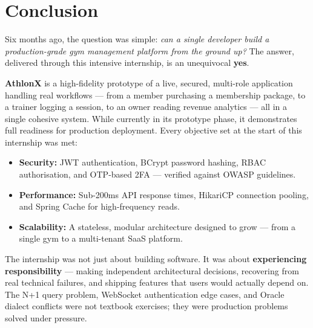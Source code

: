 \documentclass[
  12pt,
  a4paperpaper,
]{report}
\begin{document}
\clearpage

\chapter{Conclusion}\label{conclusion-1}

\noindent
Six months ago, the question was simple: \textit{can a single developer build a production-grade gym management platform from the ground up?} The answer, delivered through this intensive internship, is an unequivocal \textbf{yes}.

\vspace{0.4cm}

\noindent
\textbf{AthlonX} is a high-fidelity prototype of a live, secured, multi-role application handling real workflows --- from a member purchasing a membership package, to a trainer logging a session, to an owner reading revenue analytics --- all in a single cohesive system. While currently in its prototype phase, it demonstrates full readiness for production deployment. Every objective set at the start of this internship was met:

\vspace{0.25cm}

\begin{itemize}
  \setlength\itemsep{0.18cm}
  \item \textbf{Security:} JWT authentication, BCrypt password hashing, RBAC authorisation, and OTP-based 2FA --- verified against OWASP guidelines.
  \item \textbf{Performance:} Sub-200ms API response times, HikariCP connection pooling, and Spring Cache for high-frequency reads.
  \item \textbf{Scalability:} A stateless, modular architecture designed to grow --- from a single gym to a multi-tenant SaaS platform.
\end{itemize}

\vspace{0.4cm}

\noindent
The internship was not just about building software. It was about \textbf{experiencing responsibility} --- making independent architectural decisions, recovering from real technical failures, and shipping features that users would actually depend on. The N+1 query problem, WebSocket authentication edge cases, and Oracle dialect conflicts were not textbook exercises; they were production problems solved under pressure.

\vspace{0.4cm}
\end{document}
